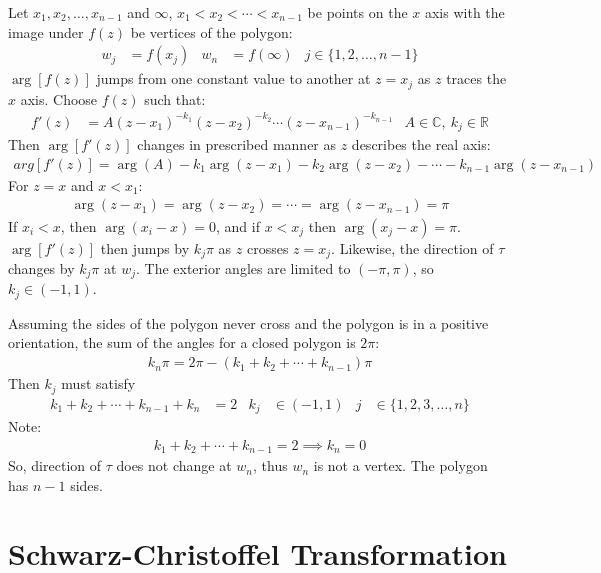 \documentclass[12pt, english]{book}
\begin{document}
	Let \(x_1, x_2, \ldots, x_{n-1}\) and \(\infty\), \(x_1<x_2<\cdots<x_{n-1}\) be points on the \(x\) axis with the image under \(f(z)\) be vertices of the polygon:
	\begin{align*}
		w_j &= f(x_j) &
		w_n &= f(\infty) &
		j \in \{1, 2, \ldots , n-1\}
	\end{align*}
	\(\arg[f(z)]\) jumps from one constant value to another at \(z=x_j\) as \(z\) traces the \(x\) axis. Choose \(f(z)\) such that:
	\begin{align*}
		f'(z) &= A(z - x_1)^{-k_1} (z-x_2)^{-k_2} \cdots (z-x_{n-1})^{-k_{n-1}} &
		A \in \mathbb{C}, \ k_j \in \mathbb{R}
	\end{align*}
	Then \(\arg[f'(z)]\) changes in prescribed manner as \(z\) describes the real axis:
	\begin{align*}
		arg[f'(z)] = \arg(A) - k_1 \arg(z - x_1) - k_2 \arg(z-x_2) - \cdots - k_{n-1} \arg(z - x_{n-1})
	\end{align*}
	For \(z = x\) and \(x < x_1\):
	\begin{align*}
		\arg(z-x_1) = \arg(z-x_2) = \cdots = \arg(z-x_{n-1}) = \pi
	\end{align*}
	If \(x_i < x\), then \(\arg(x_i - x) = 0\), and if \(x < x_j\) then \(\arg(x_j - x) = \pi\). \(\arg[f'(z)]\) then jumps by \(k_j \pi\) as \(z\) crosses \(z = x_j\). Likewise, the direction of \(\tau\) changes by \(k_j \pi\) at \(w_j\). The exterior angles are limited to \((-\pi, \pi)\), so \(k_j \in (-1, 1)\).
	
	Assuming the sides of the polygon never cross and the polygon is in a positive orientation, the sum of the angles for a closed polygon is \(2\pi\):
	\begin{align*}
		k_n \pi = 2\pi - (k_1 + k_2 + \cdots + k_{n-1}) \pi
	\end{align*}
	Then \(k_j\) must satisfy
	\begin{align*}
		k_1 + k_2 + \cdots + k_{n-1} + k_n &= 2 &
		k_j &\in (-1, 1) &
		j &\in \{1, 2, 3, \ldots, n\}
	\end{align*}
	Note:
	\begin{align*}
		k_1 + k_2 + \cdots + k_{n-1} = 2 \implies k_n = 0
	\end{align*}
	So, direction of \(\tau\) does not change at \(w_n\), thus \(w_n\) is not a vertex. The polygon has \(n - 1\) sides. 
	
	\section{Schwarz-Christoffel Transformation} \label{Schwarz-Christoffel Transformation Section - Complex} 
	
\end{document}

